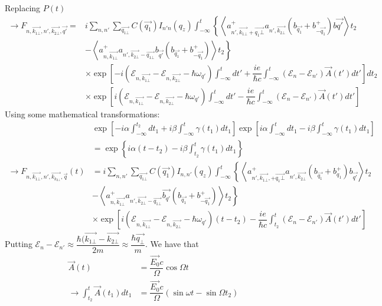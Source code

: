 \documentclass{article}
\begin{document}
\newpage
Replacing $P(t)$
\begin{align*}
    \to F_{n,\vec{k_{1\bot}},n',\vec{k_{2\bot}},\vec{q'}} = &i \sum_{n,n'}\sum_{\vec{q_{1\bot}}} C \left(\vec{q_1}\right) I_{n'n} \left(q_z\right)\int^t_{-\infty} \left\{\left\langle a^+_{n',\vec{k_{1\bot}}+\vec{q_1\bot}}a_{n',\vec{k_{2\bot}}}\left(b_{\vec{q_1}}+b^+_{-\vec{q_1}}\right)b\vec{q'}\right\rangle t_2 \right. \\
   & \left. - \left\langle  a^+_{n,\vec{k_{1\bot}}} a_{n',\vec{k_{2\bot}}-\vec{q_{1\bot}}}b_{\vec{q'}}\left(b_{\vec{q_1}}+ b^+_{-\vec{q_1}}\right)\right\rangle t_2\right\} \\
   & \times \exp \left[-i \left(\mathcal{E}_{n,\vec{k_{1\bot}}}- \mathcal{E}_{n,\vec{k_{2\bot}}}-\hbar\omega_{q'}\right) \int^t_{-\infty}dt'+ \dfrac{ie}{\hbar c} \int^t_{-\infty}\left(\mathcal{E}_n -\mathcal{E}_{n'}\right)\vec{A}(t')dt'\right]dt_2 \\
   & \times \exp \left[i \left(\mathcal{E}_{n,\vec{k_{1\bot}}}- \mathcal{E}_{n,\vec{k_{2\bot}}}-\hbar\omega_{q'}\right) \int^t_{-\infty}dt'- \dfrac{ie}{\hbar c} \int^t_{-\infty}\left(\mathcal{E}_n -\mathcal{E}_{n'}\right)\vec{A}(t')dt'\right]
\end{align*}
Using some mathematical transformations:
\begin{align*}
    & \exp \left[-i \alpha \int^{t_{2}}_{-\infty}dt_1+ i\beta \int^{t}_{-\infty}\gamma(t_1)dt_1\right] \exp \left[i \alpha\int^t_{-\infty}dt_1-i\beta \int^t_{-\infty} \gamma(t_1)dt_1\right] \\
    & = \exp \left\{i\alpha\left(t-t_2\right)- i\beta\int^t_{t_2}\gamma(t_1)dt_1\right\} \\
    \to F_{n,\vec{k_{1\bot}},n',\vec{k_{k_{2\bot}}},\vec{q}}(t) &= i \sum_{n,n'}\sum_{\vec{q_{1\bot}}} C \left(\vec{q_1}\right)I_{n,n'}(q_z) \int^t_{-\infty} \left\{ \left \langle a^+_{n', \vec{k_{1\bot}},+\vec{q_1\bot}}a_{n',\vec{k_{2\bot}}}\left(b_{\vec{q_1}}+ b^+_{q_1}\right) b_{\vec{q'}} \right \rangle t_2\right. \\
    & - \left. \left\langle a^+_{n,\vec{k_{1\bot}}}a_{n',\vec{k_{2\bot}}-\vec{q_{1\bot}}}\vec{b_{q'}}\left(b_{\vec{q_{1}}}+b^+_{-\vec{q_1}}\right)\right\rangle t_2\right\} \\
    & \times\exp \left[i \left(\mathcal{E}_{n,\vec{k_{1\bot}}}- \mathcal{E}_{n,\vec{k_{2\bot}}}-\hbar\omega_{q'}\right) (t-t_2)- \dfrac{ie}{\hbar c} \int^t_{t_2}\left(\mathcal{E}_n -\mathcal{E}_{n'}\right)\vec{A}(t')dt'\right]
\end{align*}
Putting $\mathcal{E}_n-\mathcal{E}_{n'}\approx \dfrac{\hbar(\vec{k_{1\bot}}-\vec{k_{2\bot}}}{2m}\approx \dfrac{\hbar\vec{q_\bot}}{m}$. We have that \begin{align*}
    \vec{A}(t)&= \dfrac{\vec{E_0}c}{\Omega}\cos{\Omega t}\\\to \int^t_{t_2}\vec{A}(t_1)dt_1&= \dfrac{\vec{E_0}c}{\Omega}(\sin{\omega t}-\sin{\Omega t_2}) 
\end{align*}
\end{document}
